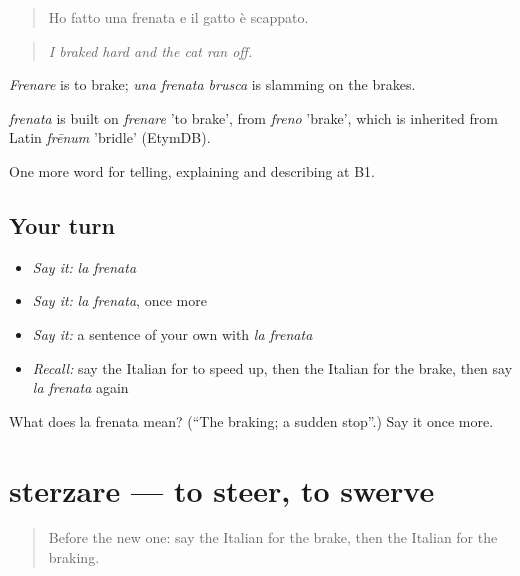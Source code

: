\begin{quote}
Ho fatto una frenata e il gatto è scappato.
\end{quote}

\begin{quote}
\emph{I braked hard and the cat ran off.}
\end{quote}

\emph{Frenare} is to brake; \emph{una frenata brusca} is slamming on the brakes.

\begin{cousinweb}
\emph{frenata} is built on \emph{frenare} 'to brake', from \emph{freno} 'brake', which is inherited from Latin \emph{frēnum} 'bridle' (EtymDB).
\end{cousinweb}

\begin{grammarlens}[title={What you've built}]
One more word for telling, explaining and describing at B1.
\end{grammarlens}

\subsection*{Your turn}
\begin{itemize}
\raggedright
  \item \emph{Say it:} \emph{la frenata}
  \item \emph{Say it:} \emph{la frenata}, once more
  \item \emph{Say it:} a sentence of your own with \emph{la frenata}
  \item \emph{Recall:} say the Italian for to speed up, then the Italian for the brake, then say \emph{la frenata} again
\end{itemize}

\begin{tcolorbox}[breakable,colback=teal!4,colframe=teal!35!black,title={Before you move on}]
What does la frenata mean? (\textquotedblleft{}The braking; a sudden stop\textquotedblright{}.) Say it once more.
\end{tcolorbox}
\section[sterzare]{sterzare — to steer, to swerve}

\label{lesson:IT-C406-sterzare}



\begin{quote}
Before the new one: say the Italian for the brake, then the Italian for the braking.
\end{quote}

